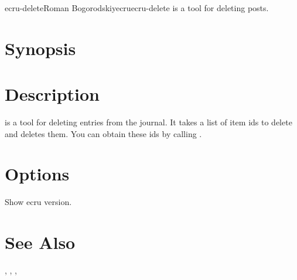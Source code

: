 \documentclass[english]{article}
\begin{document}
\begin{Name}{1}{ecru-delete}{Roman Bogorodskiy}{ecru}{ecru-delete}
	 is a tool for deleting posts.
\end{Name}

\section{Synopsis}

 

 


\section{Description}
 is a tool for deleting entries from the journal. It takes
a list of item ids to delete and deletes them. You can obtain these ids by
calling .

\section{Options}

\begin{Description}\setlength{\itemsep}{0cm}
\item[\Opt{-v}] Show ecru version.
\end{Description}

\section{See Also}

, , , 
\end{document}
